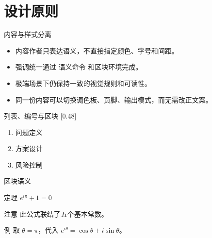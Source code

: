 \section{设计原则}

\begin{frame}{内容与样式分离}
  \begin{itemize}[<+->]
    \item 内容作者只表达语义，不直接指定颜色、字号和间距。
    \item 强调统一通过 \alert{语义命令} 和区块环境完成。
    \item 极端场景下仍保持一致的视觉规则和可读性。
    \item 同一份内容可以切换调色板、页脚、输出模式，而无需改正文案。
  \end{itemize}
\end{frame}

\begin{frame}{列表、编号与区块}
  [0.48]{%
    \begin{enumerate}
      \item 问题定义
      \item 方案设计
      \item 风险控制
    \end{enumerate}
  }
\end{frame}

\begin{frame}{区块语义}
  \begin{block}{定理}
    $e^{i\pi}+1=0$
  \end{block}
  \begin{alertblock}{注意}
    此公式联结了五个基本常数。
  \end{alertblock}
  \begin{exampleblock}{例}
    取 $\theta=\pi$，代入 $e^{i\theta}=\cos\theta+i\sin\theta$。
  \end{exampleblock}
\end{frame}

